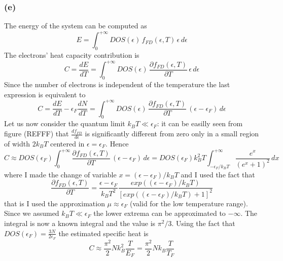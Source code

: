 \documentclass{article}
\begin{document}
\subsubsection*{(e)}
The energy of the system can be computed as 
\begin{equation*}
    E = \int_0^{+\infty} DOS(\epsilon) \, f_{FD}(\epsilon, T) \, \epsilon \, d\epsilon
\end{equation*}
The electrons' heat capacity contribution is
\begin{equation*}
    C = \frac{dE}{dT} = \int_0^{+\infty} DOS(\epsilon) \, \frac{\partial f_{FD}(\epsilon, T)}{\partial T} \, \epsilon \, d\epsilon
\end{equation*}
Since the number of electrons is independent of the temperature the last expression is equivalent to 
\begin{equation*}
    C = \frac{dE}{dT} - \epsilon_F\frac{dN}{dT} = \int_0^{+\infty} DOS(\epsilon) \, \frac{\partial f_{FD}(\epsilon, T)}{\partial T} \, (\epsilon -\epsilon_F) \, d\epsilon
\end{equation*}
Let us now consider the quantum limit $k_BT \ll \epsilon_F$: it can be easilly seen from figure (REFFF) that $\frac{df_{FD}}{d\epsilon}$ is significantly different from zero only 
in a small region of width $2k_BT$ centered in $\epsilon=\epsilon_F$. Hence
\begin{equation*}
    C \approx DOS(\epsilon_F) \int_0^{+\infty} \frac{\partial f_{FD}(\epsilon, T)}{\partial T} \, (\epsilon - \epsilon_F) \, d\epsilon = 
    DOS(\epsilon_F) k_B^2T \int_{-\epsilon_F/k_BT}^{+\infty} \frac{e^x}{(e^x + 1)^2} \, dx 
\end{equation*}
where I made the change of variable $x=(\epsilon - \epsilon_F)/k_BT$ and I used the fact that 
\begin{equation*}
    \frac{\partial f_{FD}(\epsilon, T)}{\partial T} = \frac{\epsilon - \epsilon_F}{k_BT^2} \frac{exp((\epsilon - \epsilon_F)/k_BT)}{[exp((\epsilon - \epsilon_F)/k_BT) + 1]^2}
\end{equation*}
that is I used the approximation $\mu \approx \epsilon_F$ (valid for the low temperature range).
Since we assumed $k_BT \ll \epsilon_F$ the lower extrema can be approximated to $-\infty$. The integral is now a known integral and the value is $\pi^2/3$. Using the fact that 
$DOS(\epsilon_F) = \frac{3N}{2\epsilon_F}$ the estimated specific heat is 
\begin{equation*}
    C \approx \frac{\pi^2}{2} N k_B^2 \frac{T}{E_F} = \frac{\pi^2}{2} N k_B \frac{T}{T_F}
\end{equation*}
\end{document}
